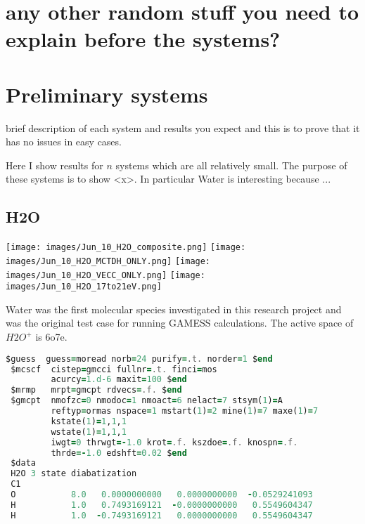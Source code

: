 


\section{any other random stuff you need to explain before the systems?}



\section{Preliminary systems}
brief description of each system and results you expect and this is to prove that it has no issues in easy cases.

Here I show results for $n$ systems which are all relatively small.
The purpose of these systems is to show <x>. 
In particular Water is interesting because ...



\subsection{H2O}

\texttt{[image: images/Jun\_10\_H2O\_composite.png]}
\texttt{[image: images/Jun\_10\_H2O\_MCTDH\_ONLY.png]}
\texttt{[image: images/Jun\_10\_H2O\_VECC\_ONLY.png]}
\texttt{[image: images/Jun\_10\_H2O\_17to21eV.png]}

Water was the first molecular species investigated in this research project and was the original test case for running GAMESS calculations. The active space of $H2O^+$ is 6o7e. 

\begin{lstlisting}[language=Fortran, caption=Example H2O Input File]
 $guess  guess=moread norb=24 purify=.t. norder=1 $end
 $mcscf  cistep=gmcci fullnr=.t. finci=mos
         acurcy=1.d-6 maxit=100 $end
 $mrmp   mrpt=gmcpt rdvecs=.f. $end
 $gmcpt  nmofzc=0 nmodoc=1 nmoact=6 nelact=7 stsym(1)=A
         reftyp=ormas nspace=1 mstart(1)=2 mine(1)=7 maxe(1)=7
         kstate(1)=1,1,1
         wstate(1)=1,1,1
         iwgt=0 thrwgt=-1.0 krot=.f. kszdoe=.f. knospn=.f.
         thrde=-1.0 edshft=0.02 $end
 $data
 H2O 3 state diabatization
 C1
 O           8.0   0.0000000000   0.0000000000  -0.0529241093
 H           1.0   0.7493169121  -0.0000000000   0.5549604347
 H           1.0  -0.7493169121   0.0000000000   0.5549604347
\end{lstlisting}

